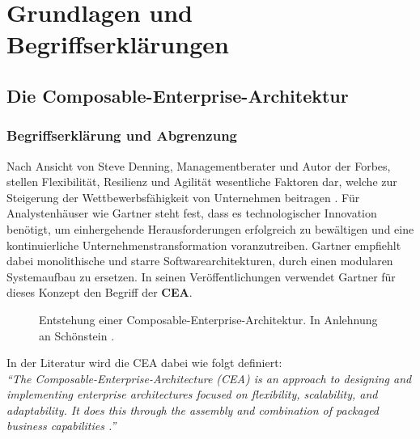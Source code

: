\section{Grundlagen und Begriffserklärungen}

\subsection{Die Composable-Enterprise-Architektur}

\subsubsection{Begriffserklärung und Abgrenzung}
\label{sec:CEA_B}
Nach Ansicht von Steve Denning, Managementberater und Autor der Forbes, stellen Flexibilität, Resilienz und Agilität wesentliche Faktoren dar, welche zur Steigerung der Wettbewerbsfähigkeit von Unternehmen beitragen \cite{Denning.20170210}. Für Analystenhäuser wie Gartner steht fest, dass es technologischer Innovation benötigt, um einhergehende Herausforderungen erfolgreich zu bewältigen und eine kontinuierliche Unternehmenstransformation voranzutreiben. Gartner empfiehlt dabei monolithische und starre Softwarearchitekturen, durch einen modularen Systemaufbau zu ersetzen. In seinen Veröffentlichungen verwendet Gartner für dieses Konzept den Begriff der \textbf{\ac{CEA}}.
\begin{center}
	\begin{figure}[H]
		\centering
		\caption[Entstehung einer Composable-Enterprise-Architektur]{Entstehung einer Composable-Enterprise-Architektur. In Anlehnung an Schönstein \cite{Schonenstein.20230103}.}
		\label{fig:CEA_S}
	\end{figure}	
\end{center}
\vspace*{-15mm}
In der Literatur wird die CEA dabei wie folgt definiert:\vspace{2mm}\\
\textit{\enquote{The Composable-Enterprise-Architecture (CEA) is an approach to designing and implementing enterprise architectures focused on flexibility, scalability, and adaptability. It does this through the assembly and combination of packaged business capabilities \cite{Gartner.20230418}.}}\vspace{2mm}\\
